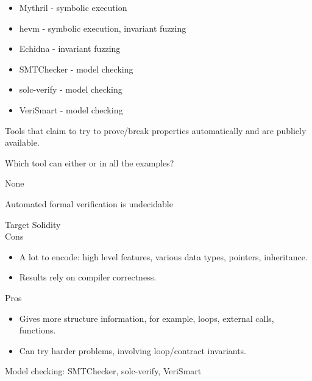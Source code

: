 \documentclass[aspectratio=169,10pt]{beamer}
\begin{document}
\begin{frame}[fragile]
\begin{center}
\begin{itemize}
\item Mythril - symbolic execution
\item hevm - symbolic execution, invariant fuzzing
\item Echidna - invariant fuzzing
\item SMTChecker - model checking
\item solc-verify - model checking
\item VeriSmart - model checking
\end{itemize}
Tools that claim to try to prove/break properties automatically and are publicly available.
\end{center}
\end{frame}

\begin{frame}[fragile]
\begin{center}
Which tool can either {\color{green}{prove correctness}} or {\color{red}{find bugs}} in all the examples?
\end{center}
\end{frame}

\begin{frame}[fragile]
\begin{center}
None
\end{center}
\end{frame}

\begin{frame}[fragile]
\begin{center}
Automated formal verification is undecidable
\end{center}
\end{frame}

\begin{frame}[fragile]
Target Solidity\\
Cons
\begin{itemize}
\item A lot to encode: high level features, various data types, pointers, inheritance.
\item Results rely on compiler correctness.
\end{itemize}
Pros\\
\begin{itemize}
\item Gives more structure information, for example, loops, external calls, functions.
\item Can try harder problems, involving loop/contract invariants.
\end{itemize}
Model checking: SMTChecker, solc-verify, VeriSmart
\end{frame}
\end{document}
